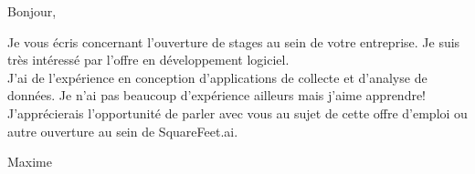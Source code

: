 \documentclass[12pt,french]{letter}
\begin{document}

\begin{letter}{}
\address{Montréal, Canada}

\opening{Bonjour,}


Je vous écris concernant l'ouverture de stages au sein de votre entreprise. Je suis très intéressé par l'offre en développement logiciel.
\\J'ai de l'expérience en conception d'applications de collecte et d'analyse de données. Je n'ai pas beaucoup d'expérience ailleurs mais j'aime apprendre!
\\J'apprécierais l'opportunité de parler avec vous au sujet de cette offre d'emploi ou autre ouverture au sein de SquareFeet.ai.

\closing{Maxime}


\end{letter}
\end{document}
